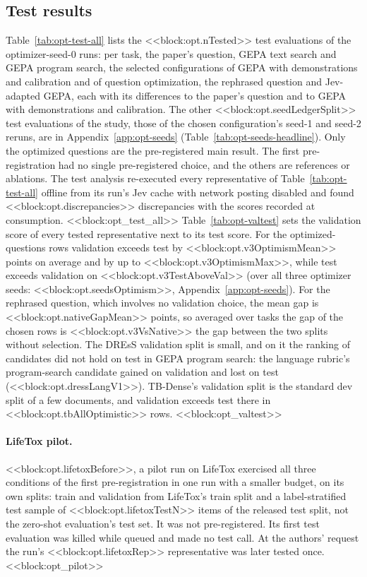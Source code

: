 \subsection{Test results}\label{app:opt-test}
Table~\ref{tab:opt-test-all} lists the <<block:opt.nTested>> test evaluations of the optimizer-seed-0 runs: per task, the paper's question, GEPA text search and GEPA program search, the selected configurations of GEPA with demonstrations and calibration and of question optimization, the rephrased question and Jev-adapted GEPA, each with its differences to the paper's question and to GEPA with demonstrations and calibration. The other <<block:opt.seedLedgerSplit>> test evaluations of the study, those of the chosen configuration's seed-1 and seed-2 reruns, are in Appendix~\ref{app:opt-seeds} (Table~\ref{tab:opt-seeds-headline}). Only the optimized questions are the pre-registered main result. The first pre-registration had no single pre-registered choice, and the others are references or ablations. The test analysis re-executed every representative of Table~\ref{tab:opt-test-all} offline from its run's Jev cache with network posting disabled and found <<block:opt.discrepancies>> discrepancies with the scores recorded at consumption.
<<block:opt_test_all>>
Table~\ref{tab:opt-valtest} sets the validation score of every tested representative next to its test score. For the optimized-questions rows validation exceeds test by <<block:opt.v3OptimismMean>> points on average and by up to <<block:opt.v3OptimismMax>>, while test exceeds validation on <<block:opt.v3TestAboveVal>> (over all three optimizer seeds: <<block:opt.seedsOptimism>>, Appendix~\ref{app:opt-seeds}). For the rephrased question, which involves no validation choice, the mean gap is <<block:opt.nativeGapMean>> points, so averaged over tasks the gap of the chosen rows is <<block:opt.v3VsNative>> the gap between the two splits without selection. The DREsS validation split is small, and on it the ranking of candidates did not hold on test in GEPA program search: the language rubric's program-search candidate gained on validation and lost on test (<<block:opt.dressLangV1>>). TB-Dense's validation split is the standard dev split of a few documents, and validation exceeds test there in <<block:opt.tbAllOptimistic>> rows.
<<block:opt_valtest>>

\paragraph{LifeTox pilot.}
<<block:opt.lifetoxBefore>>, a pilot run on LifeTox exercised all three conditions of the first pre-registration in one run with a smaller budget, on its own splits: train and validation from LifeTox's train split and a label-stratified test sample of <<block:opt.lifetoxTestN>> items of the released test split, not the zero-shot evaluation's test set. It was not pre-registered. Its first test evaluation was killed while queued and made no test call. At the authors' request the run's <<block:opt.lifetoxRep>> representative was later tested once.
<<block:opt_pilot>>

